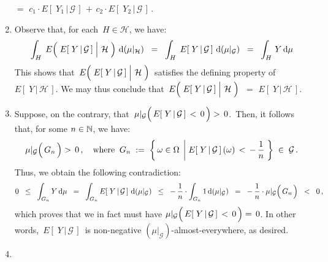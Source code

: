 \begin{enumerate}
	\;$=$\;
	$c_{1}\cdot E\!\left[\;Y_{1}\,\vert\,\mathcal{G}\,\right] \,+\, c_{2}\cdot E\!\left[\;Y_{2}\,\vert\,\mathcal{G}\,\right]$\,.
\item
	Observe that, for each \,$H \in \mathcal{H}$, we have:
	\begin{eqnarray*}
	\int_{H}\;E\!\left(\,
		\left.\overset{{\color{white}.}}{E}\!\left[\;Y\,\vert\,\mathcal{G}\,\right]\;\right\vert\,\mathcal{H}
		\;\right)
		\,\d(\mu\vert_{\mathcal{H}})
	\;\; = \;\;	
		\int_{H}\;E\!\left[\;Y\,\vert\,\mathcal{G}\,\right]\,\d(\mu\vert_{\mathcal{G}})
	\;\; = \;\;	
		\int_{H}\,Y\,\d\mu
	\end{eqnarray*}
	This shows that
	\,$E\!\left(\,\left.\overset{{\color{white}.}}{E}\!\left[\;Y\,\vert\,\mathcal{G}\,\right]\;\right\vert\,\mathcal{H}\;\right)$\,
	satisfies the defining property of $E\!\left[\;Y\,\vert\,\mathcal{H}\,\right]$.
	We may thus conclude that
	\,$E\!\left(\,\left.\overset{{\color{white}.}}{E}\!\left[\;Y\,\vert\,\mathcal{G}\,\right]\;\right\vert\,\mathcal{H}\;\right)$\,
	$=$ $E\!\left[\;Y\,\vert\,\mathcal{H}\,\right]$.
\item
	Suppose, on the contrary, that
	\,$\mu\vert_{\mathcal{G}}\!\left(\,\overset{{\color{white}.}}{E}\!\left[\;Y\,\vert\,\mathcal{G}\,\right]\,<\,0\,\right) >\,0$.\,
	Then, it follows that, for some $n \in \mathbb{N}$, we have:
	\begin{equation*}
	\mu\vert_{\mathcal{G}}\!\left(\,\overset{{\color{white}.}}{G}_{n}\,\right) >\,0\,,
	\quad\textnormal{where}\;\;
	G_{n} \; :=\; \left\{\,
		\omega\in\Omega
		\;\left\vert\;
		\overset{{\color{white}.}}{E}\!\left[\;Y\,\vert\,\mathcal{G}\,\right](\omega)\,<\,-\,\dfrac{1}{n}
		\right.\,\right\}
		\;\in\;\mathcal{G}\,.
	\end{equation*}
	Thus, we obtain the following contradiction:
	\begin{equation*}
	0 \;\;\leq\;\; \int_{G_{n}} Y\,\d\mu
	\;\;=\;\; \int_{G_{n}} E\!\left[\;Y\,\vert\,\mathcal{G}\,\right]\,\d(\mu\vert_{\mathcal{G}})
	\;\;\leq\;\; -\,\dfrac{1}{n} \cdot \int_{G_{n}} 1\,\d(\mu\vert_{\mathcal{G}})
	\;\;=\;\; -\,\dfrac{1}{n} \cdot \mu\vert_{\mathcal{G}}\!\left(\,\overset{{\color{white}.}}{G}_{n}\,\right)
	\;\; < \;\; 0\,,
	\end{equation*}
	which proves that we in fact must have
	$\mu\vert_{\mathcal{G}}\!\left(\,\overset{{\color{white}.}}{E}\!\left[\;Y\,\vert\,\mathcal{G}\,\right]\,<\,0\,\right) =\,0$.
	In other words, \,$E\!\left[\;Y\,\vert\,\mathcal{G}\,\right]$\, is non-negative
	$(\mu\vert_{\mathcal{G}})$-almost-everywhere, as desired.
\item

\end{enumerate}

